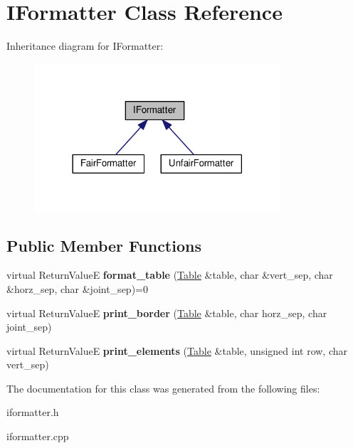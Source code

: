 \hypertarget{classIFormatter}{}\section{I\+Formatter Class Reference}
\label{classIFormatter}


Inheritance diagram for I\+Formatter\+:\nopagebreak
\begin{figure}[H]
\begin{center}
\leavevmode
\includegraphics[width=258pt]{classIFormatter__inherit__graph}
\end{center}
\end{figure}
\subsection*{Public Member Functions}
\begin{DoxyCompactItemize}
\item 
\hypertarget{classIFormatter_ad648db87f6e7574b5301d9c904213cc3}{}virtual Return\+Value\+E {\bfseries format\+\_\+table} (\hyperlink{classTable}{Table} \&table, char \&vert\+\_\+sep, char \&horz\+\_\+sep, char \&joint\+\_\+sep)=0\label{classIFormatter_ad648db87f6e7574b5301d9c904213cc3}

\item 
\hypertarget{classIFormatter_a30bf2c73a16c03ad4157999f83cdabda}{}virtual Return\+Value\+E {\bfseries print\+\_\+border} (\hyperlink{classTable}{Table} \&table, char horz\+\_\+sep, char joint\+\_\+sep)\label{classIFormatter_a30bf2c73a16c03ad4157999f83cdabda}

\item 
\hypertarget{classIFormatter_acb93ff067902af675482b9dc02fdbb05}{}virtual Return\+Value\+E {\bfseries print\+\_\+elements} (\hyperlink{classTable}{Table} \&table, unsigned int row, char vert\+\_\+sep)\label{classIFormatter_acb93ff067902af675482b9dc02fdbb05}

\end{DoxyCompactItemize}


The documentation for this class was generated from the following files\+:\begin{DoxyCompactItemize}
\item 
iformatter.\+h\item 
iformatter.\+cpp\end{DoxyCompactItemize}
